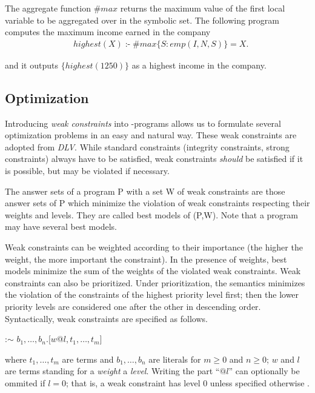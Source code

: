 \documentclass[a4paper, titlepage]{article}
\DeclareMathOperator{\leftimpl}{:-}
\newcommand\mycenterline[1]{\par\smallskip\centerline{#1} \smallskip}
\begin{document}
The aggregate function $\mathit{\#max}$ returns 
the maximum value of the first local variable to be 
aggregated over in the symbolic set. The following program 
computes the maximum income earned in the company
\begin{align*}
& \mathit{highest}(X) \leftimpl \mathit{\#max}\{S : 
\mathit{emp}(I,N,S)\} = X.
\end{align*}

and it outputs $\{highest(1250)\}$ as a highest income in 
the company.

\subsection{Optimization}
\label{optimize}
Introducing \emph{weak constraints} into \hex-programs 
allows us to formulate several optimization problems in an 
easy and natural way. These weak constraints are adopted 
from \emph{DLV}. While standard constraints (integrity 
constraints, strong constraints) always have to be 
satisfied, weak constraints \emph{should} be satisfied if it is 
possible, but may be violated if necessary.


The answer sets of a program P with a set W of weak 
constraints are those answer sets of P which minimize the 
violation of weak constraints respecting their weights and 
levels. They are called best models of (P,W). Note that a 
program may have several best models.


Weak constraints can be weighted according to their 
importance (the higher the weight, the more important the 
constraint). In the presence of weights, best models 
minimize the sum of the weights of the violated weak 
constraints. Weak constraints can also be prioritized. 
Under prioritization, the semantics minimizes the violation 
of the constraints of the highest priority level first; 
then the lower priority levels are considered one after the 
other in descending order. Syntactically, weak constraints 
are specified as follows.
%
\mycenterline{:$\sim$ $\mathit{b_1,\dots,b_n}.[\mathit{w}$@$\mathit{l},\mathit{t_1,\dots,t_m}]$} 
%
where $\mathit{t_1,\dots,t_m}$ 
are terms and $\mathit{b_1,\dots,b_n}$ are literals for $m \geq 0$  and $n \geq 0$; $w$ and $l$ are terms standing for a \emph{weight} a \emph{level}. Writing the part ``$\mathit{@l}$'' can optionally be ommited if $l=0$; that is, a weak constraint has level 0 unless specified otherwise \cite{cffiklrs2013}.
\end{document}

